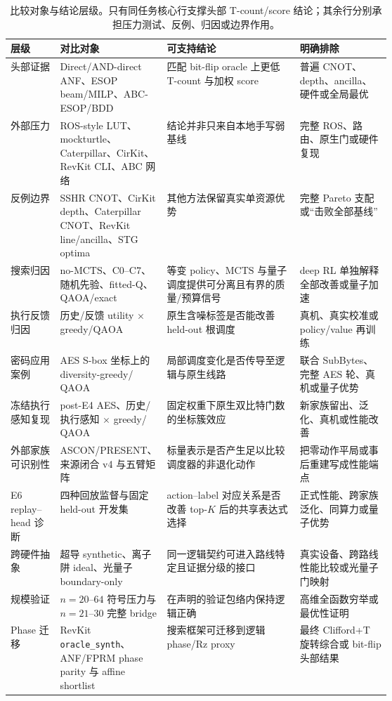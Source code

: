 \documentclass[UTF8,fontset=fandol,11pt]{ctexart}
\newcommand{\mcts}{\ensuremath{\mathrm{MCTS}}}
\newcommand{\qaoa}{\ensuremath{\mathrm{QAOA}}}
\begin{document}
\begin{table}[H]
\centering
\tiny
\setlength{\tabcolsep}{2.2pt}
\renewcommand{\arraystretch}{1.05}
\caption{比较对象与结论层级。只有同任务核心行支撑头部 T-count/score 结论；其余行分别承担压力测试、反例、归因或边界作用。}
\label{tab:claim-hierarchy-zh}
\begin{tabularx}{\linewidth}{>{\raggedright\arraybackslash}p{0.13\linewidth}>{\raggedright\arraybackslash}p{0.26\linewidth}>{\raggedright\arraybackslash}X>{\raggedright\arraybackslash}p{0.24\linewidth}}
\toprule
层级 & 对比对象 & 可支持结论 & 明确排除 \\
\midrule
头部证据 & Direct/AND-direct ANF、ESOP beam/MILP、ABC-ESOP/BDD & 匹配 bit-flip oracle 上更低 T-count 与加权 score & 普遍 CNOT、depth、ancilla、硬件或全局最优 \\
外部压力 & ROS-style LUT、mockturtle、Caterpillar、CirKit、RevKit CLI、ABC 网络 & 结论并非只来自本地手写弱基线 & 完整 ROS、路由、原生门或硬件复现 \\
反例边界 & SSHR CNOT、CirKit depth、Caterpillar CNOT、RevKit line/ancilla、STG optima & 其他方法保留真实单资源优势 & 完整 Pareto 支配或“击败全部基线” \\
搜索归因 & no-\mcts{}、C0--C7、随机先验、fitted-Q、QAOA/exact & 等变 policy、\mcts{} 与量子调度提供可分离且有界的质量/预算信号 & deep RL 单独解释全部改善或量子加速 \\
执行反馈归因 & 历史/反馈 utility $\times$ greedy/\qaoa{} & 原生含噪标签是否能改善 held-out 根调度 & 真机、真实校准或 policy/value 再训练 \\
密码应用案例 & AES S-box 坐标上的 diversity-greedy/\qaoa{} & 局部调度变化是否传导至逻辑与原生线路 & 联合 SubBytes、完整 AES 轮、真机或量子优势 \\
冻结执行感知复现 & post-E4 AES、历史/执行感知 $\times$ greedy/\qaoa{} & 固定权重下原生双比特门数的坐标簇效应 & 新家族留出、泛化、真机或性能改善 \\
外部家族可识别性 & ASCON/PRESENT、来源闭合 v4 与五臂矩阵 & 标量表示是否产生足以比较调度器的非退化动作 & 把零动作平局或事后重建写成性能端点 \\
E6 replay--head 诊断 & 四种回放监督与固定 held-out 开发集 & action--label 对应关系是否改善 top-$K$ 后的共享表达式选择 & 正式性能、跨家族泛化、同算力或量子优势 \\
跨硬件抽象 & 超导 synthetic、离子阱 ideal、光量子 boundary-only & 同一逻辑契约可进入路线特定且证据分级的接口 & 真实设备、跨路线性能比较或光量子门映射 \\
规模验证 & $n=20$--$64$ 符号压力与 $n=21$--$30$ 完整 bridge & 在声明的验证包络内保持逻辑正确 & 高维全函数穷举或最优性证明 \\
Phase 迁移 & RevKit \texttt{oracle\_synth}、ANF/FPRM phase parity 与 affine shortlist & 搜索框架可迁移到逻辑 phase/Rz proxy & 最终 Clifford+T 旋转综合或 bit-flip 头部结果 \\
\bottomrule
\end{tabularx}
\end{table}
\end{document}
